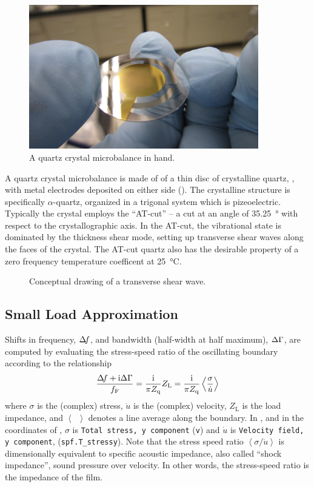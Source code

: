 \begin{figure}[ht]
 \centering
 \includegraphics[keepaspectratio,width=10cm]{qcm/figures/qcm_holding.jpg}
 \caption{A quartz crystal microbalance in hand.}
 \label{fig:qcmholding}
\end{figure}

A quartz crystal microbalance is made of of a thin disc of crystalline
quartz, , with metal electrodes deposited on either side
().  The crystalline structure is specifically
$\alpha$-quartz, organized in a trigonal system which is pizeoelectric.
Typically the crystal employs the ``AT-cut'' -- a cut at an angle of
\SI{35.25}{\degree} with respect to the crystallographic axis.  In the
AT-cut, the vibrational state is dominated by the thickness shear mode,
setting up transverse shear waves along the faces of the crystal.  The
AT-cut quartz also has the desirable property of a zero frequency
temperature coefficent at \SI{25}{\celsius}.

\begin{figure}[ht]
 \centering
	\caption{Conceptual drawing of a transverse shear wave.}
 \label{fig:qcmtsm}
\end{figure}

\subsection{Small Load Approximation}


Shifts in frequency, $\Delta\!f$, and bandwidth (half-width at half maximum),
$\Delta\Gamma$, are computed by evaluating the stress-speed ratio of the oscillating
boundary according to the relationship
\begin{equation}
 \frac{\Delta\!f+{\mathrm{i}}\Delta\Gamma}{f_{\mathrm{F}}}=\frac{{\mathrm{i}}}{\pi Z_{\mathrm{q}}}Z_\mathrm{L} =\frac{{\mathrm{i}}}{\pi Z_{\mathrm{q}}}\left<\frac{\sigma}{\dot{u}}\right>
\label{eqn:comsolextract}
\end{equation}
where $\sigma$ is the (complex) stress, $\dot{u}$ is the (complex)
velocity, $Z_\mathrm{L}$ is the load impedance, and $\left<\enspace\right>$
denotes a line average along the boundary.  In \comsol, and in the
coordinates of , $\sigma$ is 
\texttt{Total stress, y component} (\texttt{v}) and $\dot{u}$ is 
\texttt{Velocity field, y component}, (\texttt{spf.T\_stressy}).  Note that
the stress speed ratio $\left<\sigma/\dot{u}\right>$ is dimensionally equivalent to
specific acoustic impedance, also called ``shock impedance'', sound
pressure over velocity.  In other words, the stress-speed ratio is the
impedance of the film. 

